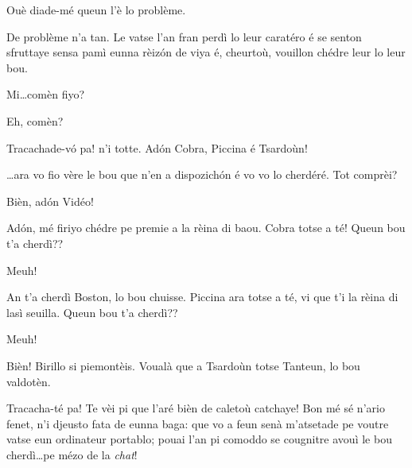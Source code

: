 \begin{drama}

\Cienspeaks {} Ouè diade-mé queun l’è lo problème.

\Schulzspeaks De problème n’a tan. Le vatse l’an fran perdì lo leur caratéro é se senton sfruttaye sensa pamì eunna rèiz\'on de viya é, cheurtoù, vouillon chédre leur lo leur bou.

\Cienspeaks Mi\ldots comèn fiyo?

\Mariettospeaks{} Eh, comèn?

\Schulzspeaks Tracachade-v\'o pa! n’i totte. Ad\'on   Cobra, Piccina é Tsardoùn!


\Schulzspeaks\ldots ara vo fio vère le bou que n’en a dispozich\'on é vo vo lo cherdéré. Tot comprèi?


\Schulzspeaks Bièn, ad\'on Vidéo!



\Schulzspeaks Ad\'on, mé firiyo chédre pe premie a la rèina di baou. Cobra totse a té! Queun bou t'a cherdì??

\Cobraspeaks{} Meuh!

\Schulzspeaks An t’a cherdì Boston, lo bou chuisse. Piccina ara totse a té, vi que t’i la rèina di lasì seuilla. Queun bou t'a cherdì??

\Piccinaspeaks{} Meuh!

\Schulzspeaks Bièn! Birillo si piemontèis. Voualà que a Tsardoùn totse Tanteun, lo bou valdotèn.


\Schulzspeaks{} Tracacha-té pa! Te vèi pi que l'aré bièn de caletoù catchaye!  Bon mé sé n'ario fenet, n'i djeusto fata de eunna baga: que vo a feun senà m'atsetade pe voutre vatse eun ordinateur portablo; pouai l'an pi comoddo se cougnitre avouì le bou cherdì\ldots pe mézo de la \textit{chat}!


\end{drama}
